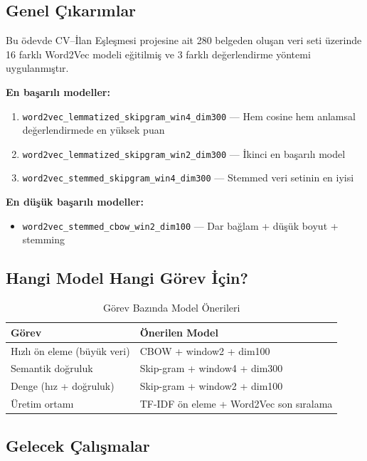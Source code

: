 \documentclass[12pt, a4paper]{article}
\begin{document}
\subsection{Genel Çıkarımlar}

Bu ödevde CV--İlan Eşleşmesi projesine ait 280 belgeden oluşan veri seti üzerinde 16 farklı Word2Vec modeli eğitilmiş ve 3 farklı değerlendirme yöntemi uygulanmıştır.

\textbf{En başarılı modeller:}
\begin{enumerate}
    \item \texttt{word2vec\_lemmatized\_skipgram\_win4\_dim300} --- Hem cosine hem anlamsal değerlendirmede en yüksek puan
    \item \texttt{word2vec\_lemmatized\_skipgram\_win2\_dim300} --- İkinci en başarılı model
    \item \texttt{word2vec\_stemmed\_skipgram\_win4\_dim300} --- Stemmed veri setinin en iyisi
\end{enumerate}

\textbf{En düşük başarılı modeller:}
\begin{itemize}
    \item \texttt{word2vec\_stemmed\_cbow\_win2\_dim100} --- Dar bağlam + düşük boyut + stemming
\end{itemize}

\subsection{Hangi Model Hangi Görev İçin?}

\begin{table}[H]
\centering
\caption{Görev Bazında Model Önerileri}
\begin{tabular}{ll}
\toprule
\textbf{Görev} & \textbf{Önerilen Model} \\
\midrule
Hızlı ön eleme (büyük veri) & CBOW + window2 + dim100 \\
Semantik doğruluk & Skip-gram + window4 + dim300 \\
Denge (hız + doğruluk) & Skip-gram + window2 + dim100 \\
Üretim ortamı & TF-IDF ön eleme + Word2Vec son sıralama \\
\bottomrule
\end{tabular}
\end{table}

\subsection{Gelecek Çalışmalar}
\end{document}
